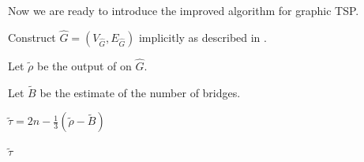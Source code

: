Now we are ready to introduce the improved algorithm for graphic TSP.

\begin{algorithm}
\caption{Improved algorithm for graphic TSP.}
\label{alg: graphic-tsp2}
    Construct $\hat{G} = (V_{\hat{G}}, E_{\hat{G}})$ implicitly as described in .
    
    Let $\tilde{\rho}$ be the output of  on $\hat{G}$.
    
    Let $\tilde{B}$ be the estimate of the number of bridges. 
    
    $\tilde{\tau} = 2n - \frac{1}{3}(\tilde{\rho} - \tilde{B})$
    
    \Return $\tilde{\tau}$
\end{algorithm}


